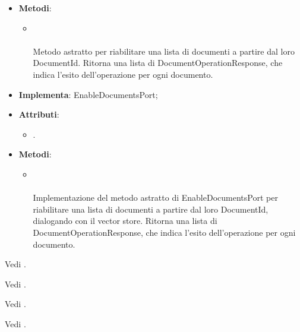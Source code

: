 \documentclass[10pt, a4paper]{article}
\begin{document}
\label{EnableDocumentsUseCaseDettaglio}
\begin{itemize}
    \item \textbf{Metodi}:
    \begin{itemize}
        \item {}\\ \\
        Metodo astratto per riabilitare una lista di documenti a partire dal loro DocumentId. Ritorna una lista di DocumentOperationResponse, che indica l'esito dell'operazione per ogni documento.
    \end{itemize}
\end{itemize}


\label{EnableDocumentsVectorStoreDettaglio}
\begin{itemize}
    \item \textbf{Implementa}: EnableDocumentsPort;
    \item \textbf{Attributi}:
    \begin{itemize}
        \item {}.
    \end{itemize}
    \item \textbf{Metodi}:
    \begin{itemize}
        \item {}\\ \\
        Implementazione del metodo astratto di EnableDocumentsPort per riabilitare una lista di documenti a partire dal loro DocumentId, dialogando con il vector store. Ritorna una lista di DocumentOperationResponse, che indica l'esito dell'operazione per ogni documento.
    \end{itemize}
\end{itemize}

Vedi .


Vedi .

Vedi .

Vedi .
\end{document}

